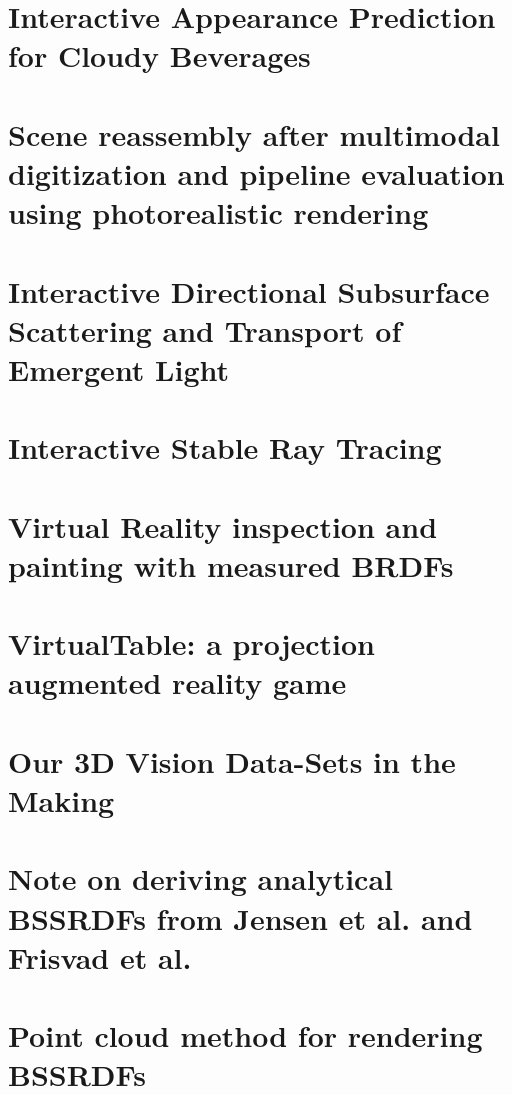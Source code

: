 \chapter{Interactive Appearance Prediction for Cloudy Beverages}
\label{sec:juice}
\label{sec:firstcontribution}

%
\chapter{Scene reassembly after multimodal digitization and pipeline evaluation using photorealistic rendering}
\label{sec:glass}

%
\chapter{Interactive Directional Subsurface Scattering and Transport of Emergent Light}
\label{sec:interactivedirsss}

%
\chapter{Interactive Stable Ray Tracing}
\label{sec:srt}

%
\chapter{Virtual Reality inspection and painting with measured BRDFs}
\label{sec:vrbrdf}
\label{sec:lastcontribution}

%
\chapter{VirtualTable: a projection augmented reality game}
\label{sec:virtualtable}

%
\chapter{Our 3D Vision Data-Sets in the Making}
\label{sec:robdataset}

%
\chapter{Note on deriving analytical BSSRDFs from Jensen et al. and Frisvad et al.}
\label{sec:jensennote}

%
\chapter{Point cloud method for rendering BSSRDFs}
\label{sec:pointcloudnote}

%
